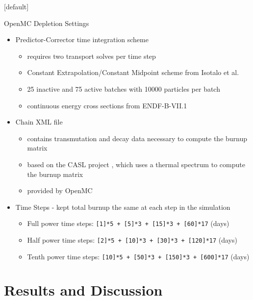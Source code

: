 \documentclass[9pt,t,aspectratio=169]{beamer}
\makeatletter
\newenvironment{withoutheadline}{
       \setbeamertemplate{headline}[default]
       \def\beamer@entrycode{\vspace*{-\headheight}}
    }{}
\makeatother
\begin{document}
\begin{withoutheadline}
\begin{frame}{OpenMC Depletion Settings}
    \pause
    \begin{itemize}
        \item<2-> Predictor-Corrector time integration scheme
        \begin{itemize}
            \item<2-> requires two transport solves per time step
            \item<2-> Constant Extrapolation/Constant Midpoint scheme from Isotalo et al. \cite{isotalo_comparison_2015}
            \item<2-> 25 inactive and 75 active batches with 10000 particles per batch
            \item<2-> continuous energy cross sections from ENDF-B-VII.1
        \end{itemize}
        \item<3-> Chain XML file
        \begin{itemize}
            \item<3-> contains transmutation and decay data necessary to compute the burnup matrix
            \item<3-> based on the CASL project \cite{CASL-report}, which uses a thermal spectrum to compute the burnup matrix
            \item<3-> provided by OpenMC \cite{openmc-chains}
        \end{itemize}
        \item<4-> Time Steps - kept total burnup the same at each step in the simulation
        \begin{itemize}
            \item<4-> Full power time steps: \texttt{[1]*5 + [5]*3 + [15]*3 + [60]*17} (days)
            \item<4-> Half power time steps: \texttt{[2]*5 + [10]*3 + [30]*3 + [120]*17} (days)
            \item<4-> Tenth power time steps: \texttt{[10]*5 + [50]*3 + [150]*3 + [600]*17} (days)
        \end{itemize}
    \end{itemize}
\end{frame}
\end{withoutheadline}
\section{Results and Discussion}
\end{document}
